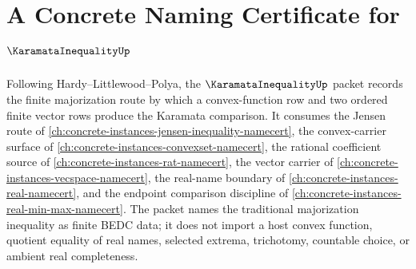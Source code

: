 \chapter{A Concrete Naming Certificate for $\KaramataInequalityUp$}
\label{ch:concrete-instances-karamata-inequality-namecert}

Following Hardy--Littlewood--Polya, the $\KaramataInequalityUp$ packet records the finite majorization route by which a convex-function row and two ordered finite vector rows produce the Karamata comparison. It consumes the Jensen route of \autoref{ch:concrete-instances-jensen-inequality-namecert}, the convex-carrier surface of \autoref{ch:concrete-instances-convexset-namecert}, the rational coefficient source of \autoref{ch:concrete-instances-rat-namecert}, the vector carrier of \autoref{ch:concrete-instances-vecspace-namecert}, the real-name boundary of \autoref{ch:concrete-instances-real-namecert}, and the endpoint comparison discipline of \autoref{ch:concrete-instances-real-min-max-namecert}. The packet names the traditional majorization inequality as finite BEDC data; it does not import a host convex function, quotient equality of real names, selected extrema, trichotomy, countable choice, or ambient real completeness.

